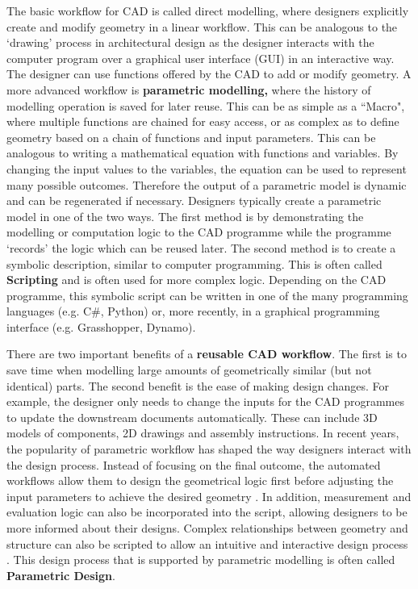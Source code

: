 The basic workflow for CAD is called direct modelling, where designers explicitly create and modify geometry in a linear workflow. This can be analogous to the ‘drawing’ process in architectural design as the designer interacts with the computer program over a graphical user interface (GUI) in an interactive way. The designer can use functions offered by the CAD to add or modify geometry. A more advanced workflow is \textbf{parametric modelling,} where the history of modelling operation is saved for later reuse. This can be as simple as a ``Macro", where multiple functions are chained for easy access, or as complex as to define geometry based on a chain of functions and input parameters. This can be analogous to writing a mathematical equation with functions and variables. By changing the input values to the variables, the equation can be used to represent many possible outcomes. Therefore the output of a parametric model is dynamic and can be regenerated if necessary. Designers typically create a parametric model in one of the two ways. The first method is by demonstrating the modelling or computation logic to the CAD programme while the programme ‘records’ the logic which can be reused later. The second method is to create a symbolic description, similar to computer programming. This is often called \textbf{Scripting} and is often used for more complex logic. Depending on the CAD programme, this symbolic script can be written in one of the many programming languages (e.g. C$\#$, Python) or, more recently, in a graphical programming interface (e.g. Grasshopper, Dynamo). 

There are two important benefits of a \textbf{reusable CAD workflow}. The first is to save time when modelling large amounts of geometrically similar (but not identical) parts. The second benefit is the ease of making design changes. For example, the designer only needs to change the inputs for the CAD programmes to update the downstream documents automatically. These can include 3D models of components, 2D drawings and assembly instructions. In recent years, the popularity of parametric workflow has shaped the way designers interact with the design process. Instead of focusing on the final outcome, the automated workflows allow them to design the geometrical logic first before adjusting the input parameters to achieve the desired geometry \parencite{jabiParametricDesignArchitecture2013}. In addition, measurement and evaluation logic can also be incorporated into the script, allowing designers to be more informed about their designs. Complex relationships between geometry and structure can also be scripted to allow an intuitive and interactive design process \parencite{pottmannArchitecturalGeometry2007, woodburyElementsParametricDesign2010}. This design process that is supported by parametric modelling is often called \textbf{Parametric Design}.

